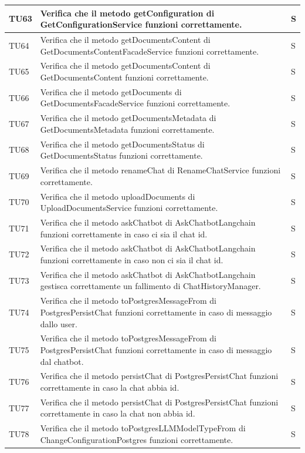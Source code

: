 \documentclass[10pt, a4paper]{article}
\begin{document}
\begin{xltabular}{\textwidth}{p{0.12\textwidth}|p{0.7\textwidth}|X}
\hline
TU63 & Verifica che il metodo getConfiguration di GetConfigurationService funzioni correttamente. & S \\
\hline
TU64 & Verifica che il metodo getDocumentsContent di GetDocumentsContentFacadeService funzioni correttamente. & S \\
\hline
TU65 & Verifica che il metodo getDocumentsContent di GetDocumentsContent funzioni correttamente. & S \\
\hline
TU66 & Verifica che il metodo getDocuments di GetDocumentsFacadeService funzioni correttamente. & S \\
\hline
TU67 & Verifica che il metodo getDocumentsMetadata di GetDocumentsMetadata funzioni correttamente. & S \\
\hline
TU68 & Verifica che il metodo getDocumentsStatus di GetDocumentsStatus funzioni correttamente. & S \\
\hline
TU69 & Verifica che il metodo renameChat di RenameChatService funzioni correttamente. & S \\
\hline
TU70 & Verifica che il metodo uploadDocuments di UploadDocumentsService funzioni correttamente. & S \\
\hline
TU71 & Verifica che il metodo askChatbot di AskChatbotLangchain funzioni correttamente in caso ci sia il chat id. & S \\
\hline
TU72 & Verifica che il metodo askChatbot di AskChatbotLangchain funzioni correttamente in caso non ci sia il chat id. & S \\
\hline
TU73 & Verifica che il metodo askChatbot di AskChatbotLangchain gestisca correttamente un fallimento di ChatHistoryManager. & S \\
\hline
TU74 & Verifica che il metodo toPostgresMessageFrom di PostgresPersistChat funzioni correttamente in caso di messaggio dallo user. & S \\
\hline
TU75 & Verifica che il metodo toPostgresMessageFrom di PostgresPersistChat funzioni correttamente in caso di messaggio dal chatbot. & S \\
\hline
TU76 & Verifica che il metodo persistChat di PostgresPersistChat funzioni correttamente in caso la chat abbia id. & S \\
\hline
TU77 & Verifica che il metodo persistChat di PostgresPersistChat funzioni correttamente in caso la chat non abbia id. & S \\
\hline
TU78 & Verifica che il metodo toPostgresLLMModelTypeFrom di ChangeConfigurationPostgres funzioni correttamente. & S \\

\end{xltabular}
\end{document}

